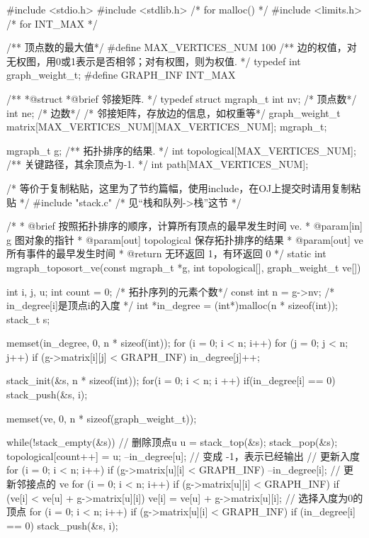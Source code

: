 \begin{Codex}[label=mgraph_critical_path.c]
#include <stdio.h>
#include <stdlib.h>  /* for malloc() */
#include <limits.h>  /* for INT_MAX */

/** 顶点数的最大值*/
#define MAX_VERTICES_NUM 100
/** 边的权值，对无权图，用0或1表示是否相邻；对有权图，则为权值. */
typedef int graph_weight_t;
#define GRAPH_INF INT_MAX

/**
 *@struct
 *@brief 邻接矩阵.
 */
typedef struct mgraph_t {
    int nv; /* 顶点数*/
    int ne; /* 边数*/
    /* 邻接矩阵，存放边的信息，如权重等*/
    graph_weight_t matrix[MAX_VERTICES_NUM][MAX_VERTICES_NUM];
} mgraph_t;

mgraph_t g;
/** 拓扑排序的结果. */
int topological[MAX_VERTICES_NUM];
/** 关键路径，其余顶点为-1. */
int path[MAX_VERTICES_NUM];

/* 等价于复制粘贴，这里为了节约篇幅，使用include，在OJ上提交时请用复制粘贴 */
#include "stack.c"  /* 见“栈和队列->栈”这节 */

/*
  * @brief 按照拓扑排序的顺序，计算所有顶点的最早发生时间 ve.
  * @param[in] g 图对象的指针
  * @param[out] topological 保存拓扑排序的结果
  * @param[out] ve 所有事件的最早发生时间
  * @return 无环返回 1，有环返回 0
  */
static int mgraph_toposort_ve(const mgraph_t *g, int topological[],
        graph_weight_t ve[]) {
    int i, j, u;
    int count = 0; /* 拓扑序列的元素个数*/
    const int n = g->nv;
    /* in_degree[i]是顶点i的入度 */
    int *in_degree = (int*)malloc(n * sizeof(int));
    stack_t s;

    memset(in_degree, 0, n * sizeof(int));
    for (i = 0; i < n; i++) {
        for (j = 0; j < n; j++) {
            if (g->matrix[i][j] < GRAPH_INF)
                in_degree[j]++;
        }
    }

    stack_init(&s, n * sizeof(int));
    for(i = 0; i < n; i ++) {
        if(in_degree[i] == 0) {
            stack_push(&s, i);
        }
    }

    memset(ve, 0, n * sizeof(graph_weight_t));

    while(!stack_empty(&s)) {
        // 删除顶点u
        u = stack_top(&s); stack_pop(&s);
        topological[count++] = u;
        --in_degree[u];  // 变成 -1，表示已经输出
        // 更新入度
        for (i = 0; i < n; i++) if (g->matrix[u][i] < GRAPH_INF) {
            --in_degree[i];
        }
        // 更新邻接点的 ve
        for (i = 0; i < n; i++) if (g->matrix[u][i] < GRAPH_INF) {
            if (ve[i] < ve[u] + g->matrix[u][i])
                ve[i] = ve[u] + g->matrix[u][i];
        }
        // 选择入度为0的顶点
        for (i = 0; i < n; i++) if (g->matrix[u][i] < GRAPH_INF) {
            if (in_degree[i] == 0) stack_push(&s, i);
        }
    }

}
\end{Codex}
